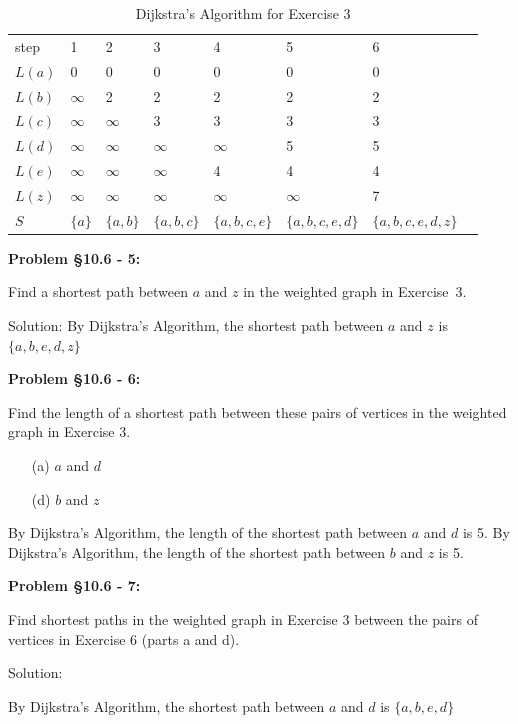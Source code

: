 \documentclass{article}
\newenvironment{problem}[1]
{\begin{mdframed}[default]
\textbf{Problem #1:}
}
{\end{mdframed}
}
\begin{document}
\begin{table}[h!]
\caption{Dijkstra's Algorithm for Exercise 3}
\label{tab:table1}
\centering
\begin{tabular}{llllllll}
 step &    1    & 2         & 3         & 4        & 5         & 6  \\
 $L(a)$&    0     & 0         & 0         & 0        & 0         & 0\\
 $L(b)$& $\infty$ & 2         & 2         & 2        & 2         & 2\\
 $L(c)$& $\infty$ & $\infty$  & 3         & 3        & 3         & 3\\
 $L(d)$& $\infty$ & $\infty$  & $\infty$  & $\infty$ & 5         & 5\\
 $L(e)$& $\infty$ & $\infty$  & $\infty$  & 4        & 4         & 4\\
 $L(z)$& $\infty$ & $\infty$  & $\infty$  & $\infty$ & $\infty$  & 7\\
 $S$   & $\{a\}$  & $\{a,b\}$ & $\{a,b,c\}$  & $\{a,b,c,e\}$  & $\{a,b,c,e,d\}$  &$\{a,b,c,e,d,z\}$ \\
 
\end{tabular}
\end{table}
\begin{problem}{\S 10.6 - 5}
Find a shortest path between $a$ and $z$ in the weighted graph in Exercise~3.

Solution:
By Dijkstra's Algorithm, the shortest path between $a$ and $z$ is
$\{a,b,e,d,z\}$
\end{problem}
\begin{problem}{\S 10.6 - 6}
Find the length of a shortest path between these pairs of
vertices in the weighted graph in Exercise 3.
\begin{enumerate}
\item[(a)] $a$ and $d$
\item[(d)] $b$ and $z$
\end{enumerate}
By Dijkstra's Algorithm, the length of the shortest path between $a$ and $d$ is 5.
By Dijkstra's Algorithm, the length of the shortest path between $b$ and $z$ is 5.
\end{problem}
\begin{problem}{\S 10.6 - 7}
Find shortest paths in the weighted graph in Exercise 3
between the pairs of vertices in Exercise 6 (parts a and d).

Solution:

By Dijkstra's Algorithm, the shortest path between $a$ and $d$ is
$\{a,b,e,d\}$
\end{problem}
\end{document}
